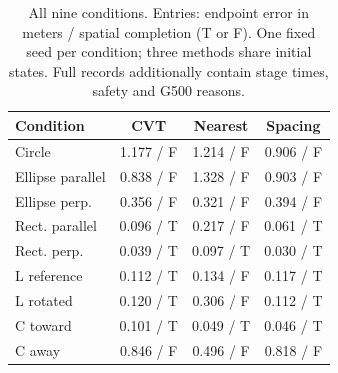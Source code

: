 \begin{table}[t]
\caption{All nine conditions. Entries: endpoint error in meters / spatial completion (T or F). One fixed seed per condition; three methods share initial states. Full records additionally contain stage times, safety and G500 reasons.}
\label{tab:census}
\centering\footnotesize
\begin{tabular}{lccc}\toprule
Condition & CVT & Nearest & Spacing\\\midrule
Circle & 1.177 / F & 1.214 / F & 0.906 / F \\
Ellipse parallel & 0.838 / F & 1.328 / F & 0.903 / F \\
Ellipse perp. & 0.356 / F & 0.321 / F & 0.394 / F \\
Rect. parallel & 0.096 / T & 0.217 / F & 0.061 / T \\
Rect. perp. & 0.039 / T & 0.097 / T & 0.030 / T \\
L reference & 0.112 / T & 0.134 / F & 0.117 / T \\
L rotated & 0.120 / T & 0.306 / F & 0.112 / T \\
C toward & 0.101 / T & 0.049 / T & 0.046 / T \\
C away & 0.846 / F & 0.496 / F & 0.818 / F \\
\bottomrule\end{tabular}
\end{table}
